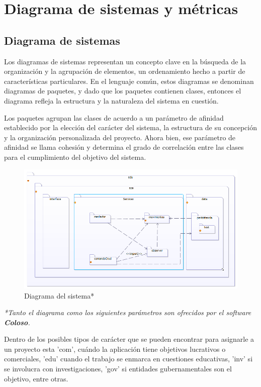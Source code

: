 \chapter{Diagrama de sistemas y métricas}
\section{Diagrama de sistemas}
Los diagramas de sistemas representan un concepto clave en la búsqueda de la organización y la agrupación de elementos, un ordenamiento hecho a partir de características particulares. En el lenguaje común, estos diagramas se denominan diagramas de paquetes, y dado que los paquetes contienen clases, entonces el diagrama refleja la estructura y la naturaleza del sistema en cuestión.

Los paquetes agrupan las clases de acuerdo a un parámetro de afinidad establecido por la elección del carácter del sistema, la estructura de su concepción y la organización personalizada del proyecto. Ahora bien, ese parámetro de afinidad se llama cohesión y determina el grado de correlación entre las clases para el cumplimiento del objetivo del sistema.

\begin{figure}[H]
	\centering
	\includegraphics[width=0.9\linewidth]{parte2/imgs/DiagramaSistema/diagramaSistemas}
	\caption{Diagrama del sistema*}
	\label{fig:diagramasistemas}
\end{figure}

\begin{flushright}
	\textit{*Tanto el diagrama como los siguientes parámetros son ofrecidos por el software \textbf{Coloso}.}
\end{flushright}

Dentro de los posibles tipos de carácter que se pueden encontrar para asignarle a un proyecto esta 'com', cuándo la aplicación tiene objetivos lucrativos o comerciales, 'edu' cuando el trabajo se enmarca en cuestiones educativas, 'inv' si se involucra con investigaciones, 'gov' si entidades gubernamentales son el objetivo, entre otras. 

